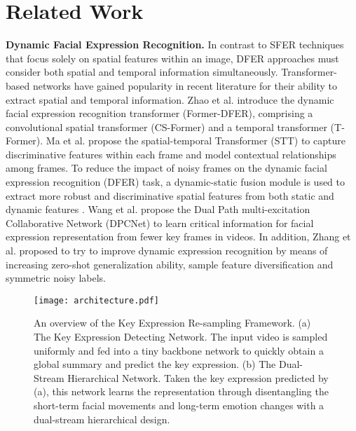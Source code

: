 \section{Related Work}
\label{sec:relat}

\textbf{Dynamic Facial Expression Recognition.} In contrast to SFER techniques that focus solely on spatial features within an image, DFER approaches must consider both spatial and temporal information simultaneously. Transformer-based networks have gained popularity in recent literature for their ability to extract spatial and temporal information. Zhao et al. \cite{zhao2021former} introduce the dynamic facial expression recognition transformer (Former-DFER), comprising a convolutional spatial transformer (CS-Former) and a temporal transformer (T-Former). Ma et al. \cite{ma2022spatio} propose the spatial-temporal Transformer (STT) to capture discriminative features within each frame and model contextual relationships among frames. To reduce the impact of noisy frames on the dynamic facial expression recognition (DFER) task, a dynamic-static fusion module is used to extract more robust and discriminative spatial features from both static and dynamic features \cite{li2022nr,li2022intensity}. Wang et al. \cite{wang2022dpcnet} propose the Dual Path multi-excitation Collaborative Network (DPCNet) to learn critical information for facial expression representation from fewer key frames in videos. In addition, Zhang et al. proposed to try to improve dynamic expression recognition by means of increasing zero-shot generalization ability\cite{zhang2025generalizable}, sample feature diversification\cite{zhang2024leave} and symmetric noisy labels\cite{zhang2024open}.


\begin{figure*}[ht!]
  \centering
  \texttt{[image: architecture.pdf]}

  \caption{An overview of the Key Expression Re-sampling Framework. (a) The Key Expression Detecting Network. The input video is sampled uniformly and fed into a tiny backbone network to quickly obtain a global summary and predict the key expression. (b) The Dual-Stream Hierarchical Network. Taken the key expression predicted by (a), this network learns the representation through disentangling the short-term facial movements and long-term emotion changes with a dual-stream hierarchical design. }
  \label{fig:architecture}
\end{figure*}

